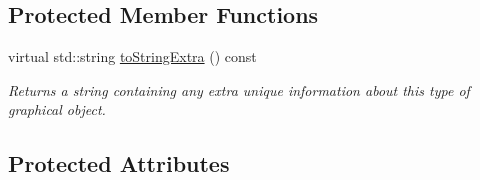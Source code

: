 \subsection*{Protected Member Functions}
\begin{DoxyCompactItemize}
\item 
virtual std\+::string \mbox{\hyperlink{classGObject_a4fcdf8de5c6de92242a975d83d8f23ea}{to\+String\+Extra}} () const
\begin{DoxyCompactList}\small\item\em Returns a string containing any extra unique information about this type of graphical object. \end{DoxyCompactList}\end{DoxyCompactItemize}
\subsection*{Protected Attributes}

